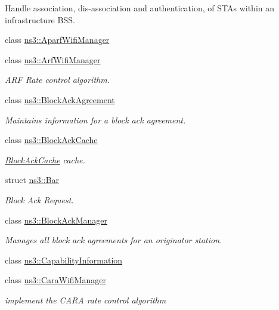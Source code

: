 \begin{DoxyCompactItemize}
\begin{DoxyCompactList}
Handle association, dis-\/association and authentication, of S\+T\+As within an infrastructure B\+SS. \end{DoxyCompactList}\item 
class \hyperlink{classns3_1_1AparfWifiManager}{ns3\+::\+Aparf\+Wifi\+Manager}
\item 
class \hyperlink{classns3_1_1ArfWifiManager}{ns3\+::\+Arf\+Wifi\+Manager}
\begin{DoxyCompactList}\small\item\em A\+RF Rate control algorithm. \end{DoxyCompactList}\item 
class \hyperlink{classns3_1_1BlockAckAgreement}{ns3\+::\+Block\+Ack\+Agreement}
\begin{DoxyCompactList}\small\item\em Maintains information for a block ack agreement. \end{DoxyCompactList}\item 
class \hyperlink{classns3_1_1BlockAckCache}{ns3\+::\+Block\+Ack\+Cache}
\begin{DoxyCompactList}\small\item\em \hyperlink{classns3_1_1BlockAckCache}{Block\+Ack\+Cache} cache. \end{DoxyCompactList}\item 
struct \hyperlink{structns3_1_1Bar}{ns3\+::\+Bar}
\begin{DoxyCompactList}\small\item\em Block Ack Request. \end{DoxyCompactList}\item 
class \hyperlink{classns3_1_1BlockAckManager}{ns3\+::\+Block\+Ack\+Manager}
\begin{DoxyCompactList}\small\item\em Manages all block ack agreements for an originator station. \end{DoxyCompactList}\item 
class \hyperlink{classns3_1_1CapabilityInformation}{ns3\+::\+Capability\+Information}
\item 
class \hyperlink{classns3_1_1CaraWifiManager}{ns3\+::\+Cara\+Wifi\+Manager}
\begin{DoxyCompactList}\small\item\em implement the C\+A\+RA rate control algorithm


\end{DoxyCompactList}
\end{DoxyCompactItemize}
